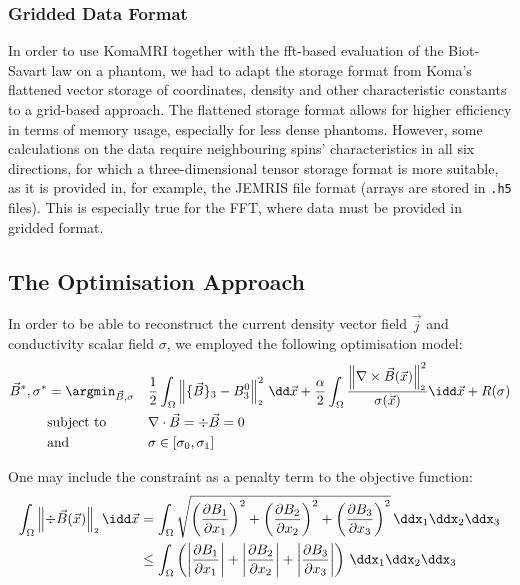 \documentclass[10pt]{article}
\renewcommand{\norm}[1]{\left\lVert#1\right\rVert_{\scriptscriptstyle 2}}
\begin{document}
  \subsubsection{Gridded Data Format}
  In order to use KomaMRI together with the \gls{fft}-based evaluation of the Biot-Savart law on a phantom, we had to adapt the storage format from Koma's flattened vector storage of coordinates, density and other characteristic constants to a grid-based approach.
  The flattened storage format allows for higher efficiency in terms of memory usage, especially for less dense phantoms.
  However, some calculations on the data require neighbouring spins' characteristics in all six directions, for which a three-dimensional tensor storage format is more suitable, as it is provided in, for example, the JEMRIS file format (arrays are stored in \texttt{.h5} files).
  This is especially true for the FFT, where data must be provided in gridded format.

  \subsection{The Optimisation Approach}
  \label{sec:optimisation-procedure}
  In order to be able to reconstruct the current density vector field $\vec{j}$ and conductivity scalar field $\sigma$, we employed the following optimisation model:
  \begin{align*}
    \vec{B}^*, \sigma^* & = \argmin_{\vec{B}, \sigma} &  & \frac{1}{2} \int_\Omega \norm{\{\vec{B}\}_3 - B_3^0}^2 \,\dd\vec{x} + \frac{\alpha}{2} \int_\Omega \frac{\norm{\nabla \times \vec{B}(\vec{x})}^2}{\sigma(\vec{x})} \idd\vec{x} + R(\sigma) \\
                        & \text{subject to}           &  & \nabla \cdot \vec{B} = \div \vec{B} = 0                                                                                                                                                    \\
                        & \text{and}                  &  & \sigma \in [\sigma_0, \sigma_1]
  \end{align*}

  One may include the constraint as a penalty term to the objective function:
  \begin{align*}
    \int_\Omega \norm{\div \vec{B}(\vec{x})} \idd\vec{x} & = \int_\Omega \sqrt{\left(\frac{\partial B_1}{\partial x_1}\right)^2 + \left(\frac{\partial B_2}{\partial x_2}\right)^2 + \left(\frac{\partial B_3}{\partial x_3}\right)^2} \,\ddx_1\ddx_2\ddx_3    \\
                                                         & \leq \int_\Omega \left(\left|\frac{\partial B_1}{\partial x_1}\right| + \left|\frac{\partial B_2}{\partial x_2}\right| + \left|\frac{\partial B_3}{\partial x_3}\right|\right) \,\ddx_1\ddx_2\ddx_3
  \end{align*}
\end{document}
